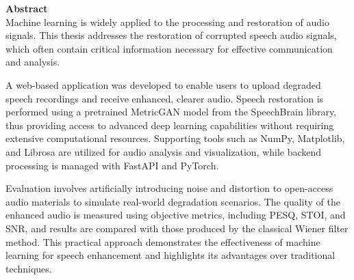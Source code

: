 \textbf{Abstract}\\[0.3cm]
Machine learning is widely applied to the processing and restoration of audio signals. This thesis addresses the restoration of corrupted speech audio signals, which often contain critical information necessary for effective communication and analysis.

A web-based application was developed to enable users to upload degraded speech recordings and receive enhanced, clearer audio. Speech restoration is performed using a pretrained MetricGAN model from the SpeechBrain library, thus providing access to advanced deep learning capabilities without requiring extensive computational resources. Supporting tools such as NumPy, Matplotlib, and Librosa are utilized for audio analysis and visualization, while backend processing is managed with FastAPI and PyTorch.

Evaluation involves artificially introducing noise and distortion to open-access audio materials to simulate real-world degradation scenarios. The quality of the enhanced audio is measured using objective metrics, including PESQ, STOI, and SNR, and results are compared with those produced by the classical Wiener filter method. This practical approach demonstrates the effectiveness of machine learning for speech enhancement and highlights its advantages over traditional techniques.